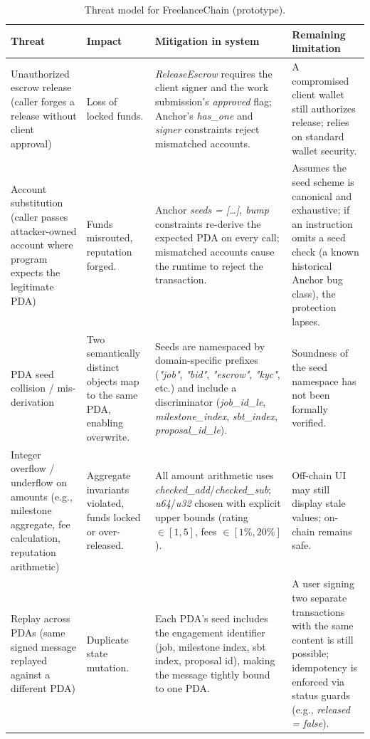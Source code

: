 \begin{table}[H]
\centering
\caption{Threat model for FreelanceChain (prototype).}
\label{table:threats}
\small
\begin{tabular}{|p{3.0cm}|p{3.0cm}|p{4.5cm}|p{3.0cm}|}
\hline
\textbf{Threat} & \textbf{Impact} & \textbf{Mitigation in system} & \textbf{Remaining limitation} \\ \hline
Unauthorized escrow release (caller forges a release without client approval) & Loss of locked funds. & \emph{ReleaseEscrow} requires the client signer and the work submission's \emph{approved} flag; Anchor's \emph{has\_one} and \emph{signer} constraints reject mismatched accounts. & A compromised client wallet still authorizes release; relies on standard wallet security. \\ \hline
Account substitution (caller passes attacker-owned account where program expects the legitimate PDA) & Funds misrouted, reputation forged. & Anchor \emph{seeds = [\ldots], bump} constraints re-derive the expected PDA on every call; mismatched accounts cause the runtime to reject the transaction. & Assumes the seed scheme is canonical and exhaustive; if an instruction omits a seed check (a known historical Anchor bug class), the protection lapses. \\ \hline
PDA seed collision / mis-derivation & Two semantically distinct objects map to the same PDA, enabling overwrite. & Seeds are namespaced by domain-specific prefixes (\emph{"job"}, \emph{"bid"}, \emph{"escrow"}, \emph{"kyc"}, etc.) and include a discriminator (\emph{job\_id\_le}, \emph{milestone\_index}, \emph{sbt\_index}, \emph{proposal\_id\_le}). & Soundness of the seed namespace has not been formally verified. \\ \hline
Integer overflow / underflow on amounts (e.g., milestone aggregate, fee calculation, reputation arithmetic) & Aggregate invariants violated, funds locked or over-released. & All amount arithmetic uses \emph{checked\_add}/\emph{checked\_sub}; \emph{u64}/\emph{u32} chosen with explicit upper bounds (rating $\in [1,5]$, fees $\in [1\%, 20\%]$). & Off-chain UI may still display stale values; on-chain remains safe. \\ \hline
Replay across PDAs (same signed message replayed against a different PDA) & Duplicate state mutation. & Each PDA's seed includes the engagement identifier (job, milestone index, sbt index, proposal id), making the message tightly bound to one PDA. & A user signing two separate transactions with the same content is still possible; idempotency is enforced via status guards (e.g., \emph{released = false}). \\ \hline

\end{tabular}
\end{table}
